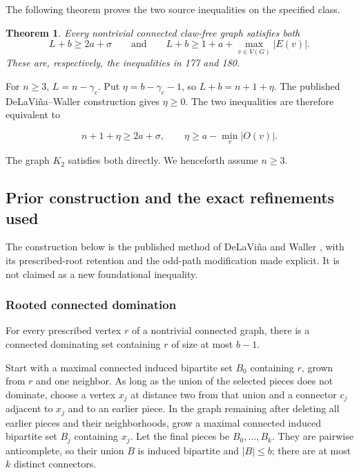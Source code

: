 \documentclass[11pt,a4paper]{article}
\newtheorem{theorem}{Theorem}[section]
\theoremstyle{definition}\newtheorem{definition}[theorem]{Definition}
\theoremstyle{remark}\newtheorem{remark}[theorem]{Remark}
\begin{document}
The following theorem proves the two source inequalities on the specified
class.
\begin{theorem}\label{late:claw:main}
Every nontrivial connected claw-free graph satisfies both
\[
 L+b\ge2a+\sigma\qquad\text{and}\qquad
 L+b\ge1+a+\max_{v\in V(G)}|E(v)|.
\]
These are, respectively, the inequalities in 177 and 180.
\end{theorem}

For \(n\ge3\), \(L=n-\gamma_c\). Put \(\eta=b-\gamma_c-1\), so
\(L+b=n+1+\eta\). The published DeLaVi\~na--Waller construction gives
\(\eta\ge0\). The two inequalities are therefore equivalent to

\[n+1+\eta\ge2a+\sigma,\qquad \eta\ge a-\min_v|O(v)|.\]

The graph \(K_2\) satisfies both directly. We henceforth assume
\(n\ge3\).

\subsection{Prior construction and the exact refinements
used}\label{late:claw:prior-construction-and-the-exact-refinements-used}

The construction below is the published method of DeLaVi\~na and Waller
\cite{late:DW}, with its prescribed-root retention and the odd-path
modification made explicit. It is not claimed as a new foundational
inequality.

\subsubsection{Rooted connected
domination}\label{late:claw:rooted-connected-domination}

For every prescribed vertex \(r\) of a nontrivial connected graph, there
is a connected dominating set containing \(r\) of size at most \(b-1\).

Start with a maximal connected induced bipartite set \(B_0\) containing
\(r\), grown from \(r\) and one neighbor. As long as the union of the
selected pieces does not dominate, choose a vertex \(x_j\) at distance
two from that union and a connector \(c_j\) adjacent to \(x_j\) and to
an earlier piece. In the graph remaining after deleting all earlier
pieces and their neighborhoods, grow a maximal connected induced
bipartite set \(B_j\) containing \(x_j\). Let the final pieces be
\(B_0,\ldots,B_k\). They are pairwise anticomplete, so their union \(B\)
is induced bipartite and \(|B|\le b\); there are at most \(k\) distinct
connectors.
\end{document}
